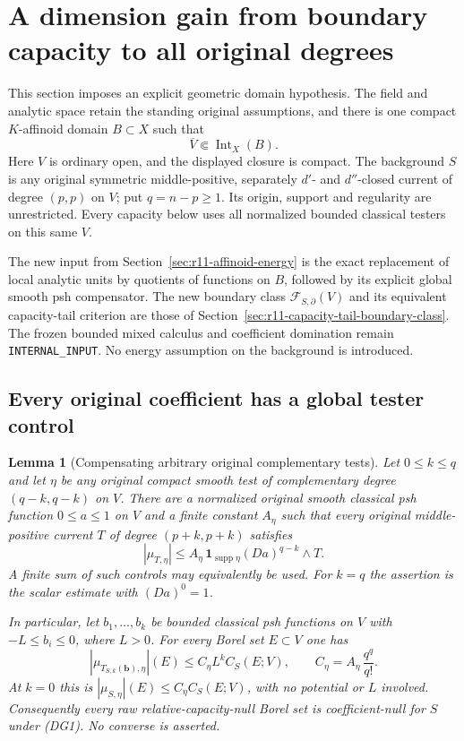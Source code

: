 \documentclass[11pt,a4paper]{article}
\numberwithin{equation}{section}
\newtheorem{lemma}[theorem]{Lemma}
\theoremstyle{definition}
\theoremstyle{remark}
\begin{document}
\section{A dimension gain from boundary capacity to all original degrees}
\label{sec:r11-capacity-dimension-gain}

This section imposes an explicit geometric domain hypothesis.
The field and analytic space retain the standing original assumptions,
and there is one compact $K$-affinoid domain $B\subset X$ such that
\[
             \overline V\Subset\operatorname{Int}_X(B).
 \tag{DG1}
\]
Here $V$ is ordinary open, and the displayed closure is compact.
The background $S$ is any original symmetric middle-positive,
separately $d'$- and $d''$-closed current of degree $(p,p)$ on $V$;
put $q=n-p\geq1$. Its origin, support and regularity are unrestricted.
Every capacity below uses all normalized bounded classical testers
on this same $V$.

The new input from Section~\ref{sec:r11-affinoid-energy} is the
exact replacement of local analytic units by quotients of functions
on $B$, followed by its explicit global smooth psh compensator.
The new boundary class
$\mathcal F_{S,\partial}(V)$ and its equivalent capacity-tail
criterion are those of Section~\ref{sec:r11-capacity-tail-boundary-class}.
The frozen bounded mixed calculus and coefficient domination remain
\texttt{INTERNAL\_INPUT}. No energy assumption on the background
is introduced.

\subsection{Every original coefficient has a global tester control}

\begin{lemma}[Compensating arbitrary original complementary tests]
\label{lem:r11-global-capacity-coefficient-control}
Let $0\leq k\leq q$ and let $\eta$ be any original compact smooth
test of complementary degree $(q-k,q-k)$ on $V$. There are a
normalized original smooth classical psh function $0\leq a\leq1$
on $V$ and a finite constant $A_\eta$ such that every original
middle-positive current $T$ of degree $(p+k,p+k)$ satisfies
\[
       |\mu_{T,\eta}|
       \leq A_\eta\,\mathbf1_{\operatorname{supp}\eta}
                         (Da)^{q-k}\wedge T .
 \tag{DG2}
\]
A finite sum of such controls may equivalently be used.
For $k=q$ the assertion is the scalar estimate with $(Da)^0=1$.

In particular, let $b_1,\ldots,b_k$ be bounded classical psh
functions on $V$ with $-L\leq b_i\leq0$, where $L>0$.
For every Borel set $E\subset V$ one has
\[
 |\mu_{T_{S,k}(\mathbf b),\eta}|(E)
       \leq C_\eta L^k C_S(E;V),\qquad
       C_\eta=A_\eta\,\frac{q^q}{q!}.
 \tag{DG3}
\]
At $k=0$ this is $|\mu_{S,\eta}|(E)\leq C_\eta C_S(E;V)$,
with no potential or $L$ involved. Consequently every raw
relative-capacity-null Borel set is coefficient-null for $S$
under (DG1). No converse is asserted.
\end{lemma}
\end{document}
